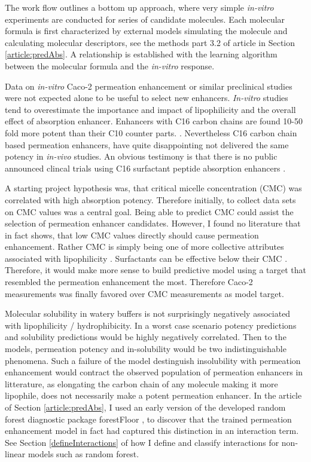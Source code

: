The work flow outlines a bottom up approach, where very simple \textit{in-vitro} experiments are conducted for series of candidate molecules. Each molecular formula is first characterized by external models simulating the molecule and calculating molecular descriptors, see the methods part 3.2 of article in Section \ref{article:predAbs}. A relationship is established with the learning algorithm between the molecular formula and the \textit{in-vitro} response.

Data on \textit{in-vitro} Caco-2 permeation enhancement or similar preclinical studies were not expected alone to be useful to select new enhancers. \textit{In-vitro} studies tend to overestimate the importance and impact of lipophilicity and the overall effect of absorption enhancer. Enhancers with C16 carbon chains are found 10-50 fold more potent than their C10 counter parts. \cite{maher2009safety,tippin2008biorelevant}. Nevertheless C16 carbon chain based permeation enhancers, have quite disappointing not delivered the same potency in \textit{in-vivo} studies. An obvious testimony is that there is no public announced clincal trials using C16 surfactant peptide absorption enhancers \cite{aguirre2016current}.

A starting project hypothesis was, that critical micelle concentration (CMC) was correlated with high absorption potency. Therefore initially, to collect data sets on CMC values was a central goal. Being able to predict CMC could assist the selection of permeation enhancer candidates. However, I found no literature that in fact shows, that low CMC values directly should cause permeation enhancement. Rather CMC is simply being one of more collective attributes associated with lipophilicity \cite{rosen2012surfactants}. Surfactants can be effective below their CMC \cite{xia2000mechanistic}. Therefore, it would make more sense to build predictive model using a target that resembled the permeation enhancement the most. Therefore Caco-2 measurements was finally favored over CMC measurements as model target.

Molecular solubility in watery buffers is not surprisingly negatively associated with lipophilicity / hydrophibicity. In a worst case scenario potency predictions and solubility predictions would be highly negatively correlated. Then to the models, permeation potency and in-solubility would be two indistinguishable phenomena. Such a failure of the model destinguish insolubility with permeation enhancement would contract the observed population of permeation enhancers in litterature, as elongating the carbon chain of any molecule making it more lipophile, does not necessarily make a potent permeation enhancer. In the article of Section \ref{article:predAbs}, I used an early version of the developed random forest diagnostic package forestFloor \cite{welling2016forest}, to discover that the trained permeation enhancement model in fact had captured this distinction in an interaction term. See Section \ref{defineInteractions} of how I define and classify interactions for non-linear models such as random forest.

